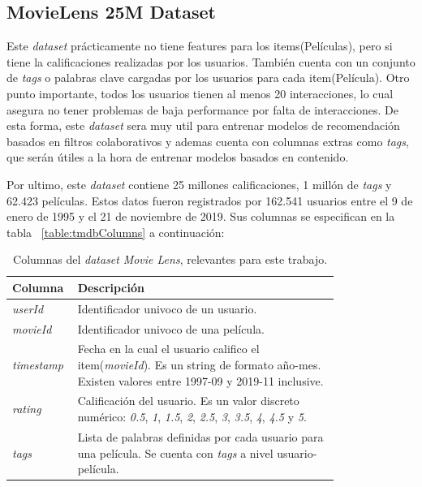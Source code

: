 \documentclass[11pt,a4paper,twoside]{thesis}
\begin{document}
\subsection{MovieLens 25M Dataset}

Este \textit{dataset} \cite{movielens} prácticamente no tiene features para los items(Películas), pero si tiene la calificaciones realizadas por los usuarios. También cuenta con un conjunto de \textit{tags} o palabras clave cargadas por los usuarios para cada item(Película). Otro punto importante, todos los usuarios tienen al menos 20 interacciones, lo cual asegura no tener problemas de baja performance por falta de interacciones. 
De esta forma, este \textit{dataset} sera muy util para entrenar modelos de recomendación basados en filtros colaborativos
y ademas cuenta con columnas extras como \textit{tags}, que serán útiles a la hora de entrenar modelos basados en contenido.

Por ultimo, este \textit{dataset} contiene 25 millones calificaciones, 1 millón de \textit{tags} y 62.423 películas. Estos datos fueron registrados por 162.541 usuarios entre el 9 de enero de 1995 y el 21 de noviembre de 2019. Sus columnas se especifican en la tabla ~\ref{table:tmdbColumns} a continuación:


\begin{table}[!htb]
	\centering
	\footnotesize
	\begin{tabular}{l | p{0.8\linewidth}}
	\hline
		Columna         & Descripción \\
	\hline
	\textit{userId}     & Identificador univoco de un usuario.\\
	\textit{movieId}    & Identificador univoco de una película.\\
	\textit{timestamp}  & Fecha en la cual el usuario califico el item(\textit{movieId}). Es un string de formato año-mes. Existen valores entre 1997-09 y 2019-11 inclusive. \\
	\textit{rating}     & Calificación del usuario. Es un valor discreto numérico: \textit{0.5}, \textit{1}, \textit{1.5}, \textit{2}, \textit{2.5}, \textit{3}, \textit{3.5}, \textit{4}, \textit{4.5} y \textit{5}. \\
	\textit{tags}       & Lista de palabras definidas por cada usuario para una película. Se cuenta con \textit{tags} a nivel usuario-película. \\
	\hline
	\end{tabular}
	\caption{
		Columnas del \textit{dataset} \textit{Movie Lens}, relevantes para este trabajo.
	}
	\label{table:movieLensColumns}
\end{table}
\end{document}
